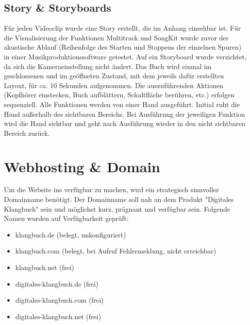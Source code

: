 \vspace{0.5cm}





\subsection{Story \& Storyboards}
Für jeden Videoclip wurde eine Story erstellt, die im Anhang einsehbar ist. Für die Visualisierung der Funktionen Multitrack und SongKit wurde zuvor der akustische Ablauf (Reihenfolge des Starten und Stoppens der einzelnen Spuren) in einer Musikproduktionssoftware getestet. Auf ein Storyboard wurde verzichtet, da sich die Kameraeinstellung nicht ändert. Das Buch wird einmal im geschlossenen und im geöffneten Zustand, mit dem jeweils dafür erstellten Layout, für ca. 10 Sekunden aufgenommen. Die auszuführenden Aktionen (Kopfhörer einstecken, Buch aufblättern, Schaltfläche berühren, etc.) erfolgen sequenziell. Alle Funktionen werden von einer Hand ausgeführt. Initial ruht die Hand außerhalb des sichtbaren Bereichs. Bei Ausführung der jeweiligen Funktion  wird die Hand sichtbar und geht nach Ausführung wieder in den nicht sichtbaren Bereich zurück.


\vspace{0.5cm}




\section{Webhosting \& Domain}
Um die Website ins verfügbar zu machen, wird ein strategisch sinnvoller Domainname benötigt. Der Domainname soll nah an dem Produkt "Digitales Klangbuch" sein und möglichst kurz, prägnant und verfügbar sein. Folgende Namen wurden auf Verfügbarkeit geprüft:

\begin{itemize}
\item klangbuch.de (belegt, unkonfiguriert)
\item klangbuch.com (belegt, bei Aufruf Fehlermeldung, nicht erreichbar)
\item klangbuch.net (frei)
\item digitales-klangbuch.de (frei)
\item digitales-klangbuch.com (frei)
\item digitales-klangbuch.net (frei)
\end{itemize}

